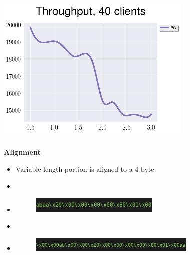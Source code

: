\documentclass[usenames,dvipsnames, 18pt, compress, aspectratio=169]{beamer}
\begin{document}
\begin{frame}
    \frametitle{}
    \begin{center}

        \includegraphics[width=0.7\textwidth,center]{document_size.png}

    \end{center}
\end{frame}

\begin{frame}
    \frametitle{}
    \begin{center}
    \textbf{Alignment}

    \begin{itemize}[label={}]
        \item Variable-length portion is aligned to a 4-byte
        \item \inputminted[fontsize=\Large]{sql}{sql/insert_align1.sql}
        \item \begin{figure}
            \includegraphics[width=0.58\textwidth,left]{align_short.png}
        \end{figure}

        \item \inputminted[fontsize=\Large]{sql}{sql/insert_align2.sql}
        \item \begin{figure}
            \includegraphics[width=0.75\textwidth,left]{align_long.png}
        \end{figure}

    \end{itemize}

    \end{center}
\end{frame}
\end{document}
